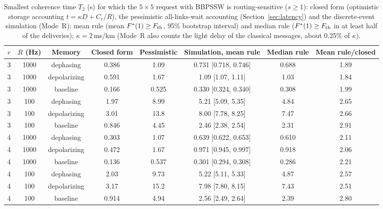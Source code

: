 \begin{table}[t]
\centering
\caption{Smallest coherence time $T_2$ (s) for which the $5\times5$ request with BBPSSW is routing-sensitive ($s\ge1$): closed form (optimistic storage accounting $t=\kappa D+C_r/R$), the pessimistic all-links-wait accounting (Section~\ref{sec:latency}) and the discrete-event simulation (Mode~R): mean rule (mean $F^*(1)\ge F_{\rm th}$, 95\% bootstrap interval) and median rule ($F^*(1)\ge F_{\rm th}$ in at least half of the deliveries); $\kappa=2$\,ms/km (Mode~R also counts the light delay of the classical messages, about 0.25\% of $\kappa$).}
\label{tab:desdesign}
\footnotesize
\begin{tabular}{cccccccc}
\toprule
$r$ & $R$ (Hz) & Memory & Closed form & Pessimistic & Simulation, mean rule & Median rule & Mean rule/closed\\
\midrule
3 & 1000 & dephasing & 0.386 & 1.09 & 0.731 [0.718, 0.746] & 0.688 & 1.89\\
3 & 1000 & depolarizing & 0.591 & 1.67 & 1.09 [1.07, 1.11] & 1.03 & 1.84\\
3 & 1000 & baseline & 0.166 & 0.525 & 0.330 [0.324, 0.340] & 0.308 & 1.99\\
3 & 100 & dephasing & 1.97 & 8.99 & 5.21 [5.09, 5.35] & 4.84 & 2.65\\
3 & 100 & depolarizing & 3.01 & 13.8 & 8.00 [7.78, 8.25] & 7.47 & 2.66\\
3 & 100 & baseline & 0.846 & 4.45 & 2.46 [2.38, 2.54] & 2.31 & 2.91\\
4 & 1000 & dephasing & 0.303 & 1.07 & 0.639 [0.622, 0.653] & 0.610 & 2.11\\
4 & 1000 & depolarizing & 0.472 & 1.67 & 0.971 [0.945, 0.997] & 0.918 & 2.06\\
4 & 1000 & baseline & 0.136 & 0.537 & 0.301 [0.294, 0.308] & 0.286 & 2.21\\
4 & 100 & dephasing & 2.03 & 9.73 & 5.22 [5.11, 5.33] & 4.87 & 2.57\\
4 & 100 & depolarizing & 3.17 & 15.2 & 7.98 [7.80, 8.15] & 7.43 & 2.51\\
4 & 100 & baseline & 0.914 & 4.94 & 2.56 [2.49, 2.64] & 2.39 & 2.80\\
\bottomrule
\end{tabular}
\end{table}
